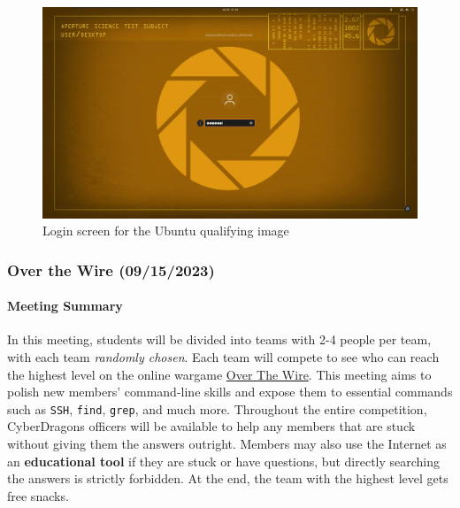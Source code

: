 \documentclass[
  letterpaper,
  DIV=11,
  numbers=noendperiod]{scrartcl}
\let\oldparagraph\paragraph
\renewcommand{\paragraph}[1]{\oldparagraph{#1}\mbox{}}
\begin{document}
\begin{figure}

{\centering \includegraphics[width=5.20833in,height=\textheight]{img/login-screen.png}

}

\caption{Login screen for the Ubuntu qualifying image}

\end{figure}

\newpage{}

\hypertarget{over-the-wire-09152023}{%
\subsubsection{Over the Wire
(09/15/2023)}\label{over-the-wire-09152023}}

\hypertarget{meeting-summary-2}{%
\paragraph{Meeting Summary}\label{meeting-summary-2}}

In this meeting, students will be divided into teams with 2-4 people per
team, with each team \emph{randomly chosen}. Each team will compete to
see who can reach the highest level on the online wargame
\href{https://overthewire.org/wargames/}{Over The Wire}. This meeting
aims to polish new members' command-line skills and expose them to
essential commands such as \texttt{SSH}, \texttt{find}, \texttt{grep},
and much more. Throughout the entire competition, CyberDragons officers
will be available to help any members that are stuck without giving them
the answers outright. Members may also use the Internet as an
\textbf{educational tool} if they are stuck or have questions, but
directly searching the answers is strictly forbidden. At the end, the
team with the highest level gets free snacks.
\end{document}
